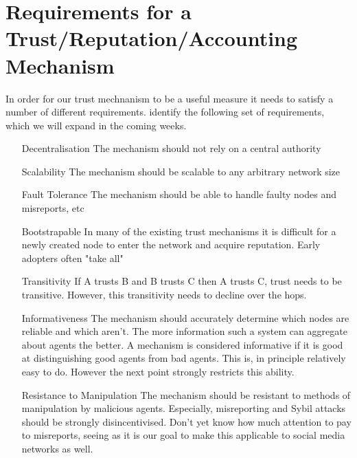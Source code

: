 \documentclass[11pt,a4paper]{report}
\theoremstyle{definition}
\theoremstyle{theorem}
\theoremstyle{proposition}
\theoremstyle{corollary}
\theoremstyle{lemma}
\theoremstyle{example}
\theoremstyle{remark}
\begin{document}
\section{Requirements for a Trust/Reputation/Accounting Mechanism}
\label{sec:Requirements for a Trust/Reputation/Accounting Mechanism}
In order for our trust mechnanism to be a useful measure it needs to satisfy a number of different requirements. \cite{Trust in Distributed Systems} identify the following set of requirements, which we will expand in the coming weeks.
\begin{itemize}
\item[Decentralisation] The mechanism should not rely on a central authority
\item[Scalability] The mechanism should be scalable to any arbitrary network size
\item[Fault Tolerance] The mechanism should be able to handle faulty nodes and misreports, etc
\item[Bootstrapable] In many of the existing trust mechanisms it is difficult for a newly created node to enter the network and acquire reputation. Early adopters often "take all" 
\item[Transitivity] If A trusts B and B trusts C then A trusts C, trust needs to be transitive. However, this transitivity needs to decline over the hops. 
\item[Informativeness] The mechanism should accurately determine which nodes are reliable and which aren't. The more information such a system can aggregate about agents the better. A mechanism is considered informative if it is good at distinguishing good agents from bad agents. This is, in principle relatively easy to do. However the next point strongly restricts this ability.
\item[Resistance to Manipulation] The mechanism should be resistant to methods of manipulation by malicious agents. Especially, misreporting and Sybil attacks should be strongly disincentivised. Don't yet know how much attention to pay to misreports, seeing as it is our goal to make this applicable to social media networks as well. 
\end{itemize} 
\end{document}
